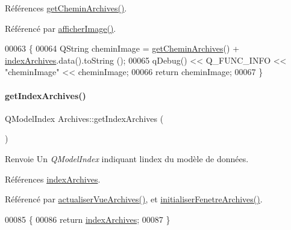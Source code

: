 Références \hyperlink{class_archives_a65dfbaba0123e6530b03bfb70e614c90}{get\+Chemin\+Archives()}.



Référencé par \hyperlink{class_archives_a0e12a12774643d96831be4daba73976e}{afficher\+Image()}.


\begin{DoxyCode}
00063 \{
00064     QString cheminImage = \hyperlink{class_archives_a65dfbaba0123e6530b03bfb70e614c90}{getCheminArchives}() + \hyperlink{class_archives_a31cba52f3979585ee5e2b9390d21322b}{indexArchives}.data().toString
      ();
00065     qDebug() << Q\_FUNC\_INFO << \textcolor{stringliteral}{"cheminImage"} << cheminImage;
00066     \textcolor{keywordflow}{return} cheminImage;
00067 \}
\end{DoxyCode}
\mbox{\label{class_archives_a3df83e6dd301afe331d7e75bd1b84a57}} 
\paragraph{\texorpdfstring{get\+Index\+Archives()}{getIndexArchives()}}
{\footnotesize\ttfamily Q\+Model\+Index Archives\+::get\+Index\+Archives (\begin{DoxyParamCaption}{ }\end{DoxyParamCaption})}

\begin{DoxyReturn}{Renvoie}
Un {\itshape Q\+Model\+Index} indiquant l\textquotesingle{}index du modèle de données. 
\end{DoxyReturn}


Références \hyperlink{class_archives_a31cba52f3979585ee5e2b9390d21322b}{index\+Archives}.



Référencé par \hyperlink{class_archives_a380ac387d773b07ea5138347dbaca65a}{actualiser\+Vue\+Archives()}, et \hyperlink{class_archives_a1842ebad3721929949bc07be5144b79c}{initialiser\+Fenetre\+Archives()}.


\begin{DoxyCode}
00085 \{
00086     \textcolor{keywordflow}{return} \hyperlink{class_archives_a31cba52f3979585ee5e2b9390d21322b}{indexArchives};
00087 \}
\end{DoxyCode}
\mbox{\label{class_archives_ab5a55ac2e810cfdec3ce19af14087ceb}} 
